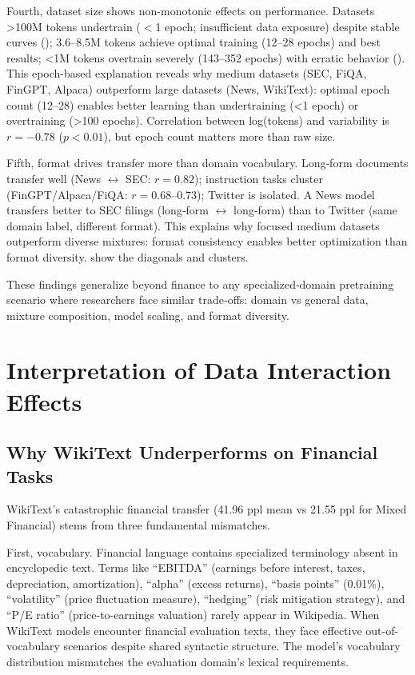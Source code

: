 Fourth, dataset size shows non-monotonic effects on performance. Datasets >100M tokens undertrain ($<$1 epoch; insufficient data exposure) despite stable curves (); 3.6–8.5M tokens achieve optimal training (12–28 epochs) and best results; <1M tokens overtrain severely (143–352 epochs) with erratic behavior (). This epoch-based explanation reveals why medium datasets (SEC, FiQA, FinGPT, Alpaca) outperform large datasets (News, WikiText): optimal epoch count (12–28) enables better learning than undertraining (<1 epoch) or overtraining (>100 epochs). Correlation between log(tokens) and variability is $r=-0.78$ ($p<0.01$), but epoch count matters more than raw size.

Fifth, format drives transfer more than domain vocabulary. Long‑form documents transfer well (News $\leftrightarrow$ SEC: $r=0.82$); instruction tasks cluster (FinGPT/Alpaca/FiQA: $r=0.68$–$0.73$); Twitter is isolated. A News model transfers better to SEC filings (long‑form $\leftrightarrow$ long‑form) than to Twitter (same domain label, different format). This explains why focused medium datasets outperform diverse mixtures: format consistency enables better optimization than format diversity.  show the diagonals and clusters.

These findings generalize beyond finance to any specialized‑domain pretraining scenario where researchers face similar trade‑offs: domain vs general data, mixture composition, model scaling, and format diversity.

\section{Interpretation of Data Interaction Effects}

\subsection{Why WikiText Underperforms on Financial Tasks}

WikiText's catastrophic financial transfer (41.96 ppl mean vs 21.55 ppl for Mixed Financial) stems from three fundamental mismatches.

First, vocabulary. Financial language contains specialized terminology absent in encyclopedic text. Terms like ``EBITDA'' (earnings before interest, taxes, depreciation, amortization), ``alpha'' (excess returns), ``basis points'' (0.01\%), ``volatility'' (price fluctuation measure), ``hedging'' (risk mitigation strategy), and ``P/E ratio'' (price-to-earnings valuation) rarely appear in Wikipedia. When WikiText models encounter financial evaluation texts, they face effective out-of-vocabulary scenarios despite shared syntactic structure. The model's vocabulary distribution mismatches the evaluation domain's lexical requirements.

